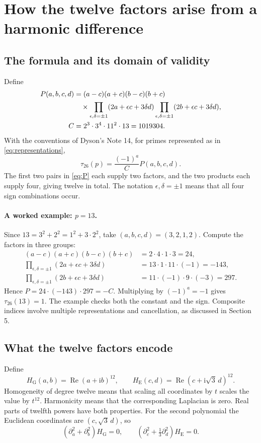 \documentclass[a4paper,11pt]{article}
\theoremstyle{definition}
\DeclareMathOperator{\Repart}{Re}
\newcommand{\iu}{\mathrm i}
\begin{document}
\section{How the twelve factors arise from a harmonic difference}
\subsection{The formula and its domain of validity}
Define
\begin{align}
 P(a,b,c,d)
 &=(a-c)(a+c)(b-c)(b+c)\notag\\
 &\quad{}\times
   \prod_{\epsilon,\delta=\pm1}(2a+\epsilon c+3\delta d)
   \prod_{\epsilon,\delta=\pm1}(2b+\epsilon c+3\delta d),
   \label{eq:P}\\
 C&=2^3\cdot3^4\cdot11^2\cdot13=1019304.\label{eq:C}
\end{align}
With the conventions of Dyson's Note 14, for primes represented as in
\eqref{eq:representations},
\begin{equation}\label{eq:Atkin}
 \tau_{26}(p)=\frac{(-1)^a}{C}P(a,b,c,d).
\end{equation}
The first two pairs in \eqref{eq:P} each supply two factors, and the two
products each supply four, giving twelve in total.
The notation \(\epsilon,\delta=\pm1\) means that all four sign combinations occur.

\paragraph{A worked example: \(p=13\).}
Since \(13=3^2+2^2=1^2+3\cdot2^2\), take \((a,b,c,d)=(3,2,1,2)\).
Compute the factors in three groups:
\[
 \begin{aligned}
 (a-c)(a+c)(b-c)(b+c)&=2\cdot4\cdot1\cdot3=24,\\
 \prod_{\epsilon,\delta=\pm1}(2a+\epsilon c+3\delta d)
 &=13\cdot1\cdot11\cdot(-1)=-143,\\
 \prod_{\epsilon,\delta=\pm1}(2b+\epsilon c+3\delta d)
 &=11\cdot(-1)\cdot9\cdot(-3)=297.
 \end{aligned}
\]
Hence \(P=24\cdot(-143)\cdot297=-C\).
Multiplying by \((-1)^a=-1\) gives \(\tau_{26}(13)=1\).
The example checks both the constant and the sign.
Composite indices involve multiple representations and cancellation, as discussed in Section 5.

\subsection{What the twelve factors encode}
Define
\begin{equation}\label{eq:H}
 H_{\mathrm G}(a,b)=\Repart(a+\iu b)^{12},\qquad
 H_{\mathrm E}(c,d)=\Repart(c+\iu\sqrt3\,d)^{12}.
\end{equation}
Homogeneity of degree twelve means that scaling all coordinates by \(t\)
scales the value by \(t^{12}\). Harmonicity means that the corresponding
Laplacian is zero. Real parts of twelfth powers have both properties.
For the second polynomial the Euclidean coordinates are \((c,\sqrt3\,d)\), so
\[
 (\partial_a^2+\partial_b^2)H_{\mathrm G}=0,\qquad
 (\partial_c^2+\tfrac13\partial_d^2)H_{\mathrm E}=0.
\]
\end{document}
